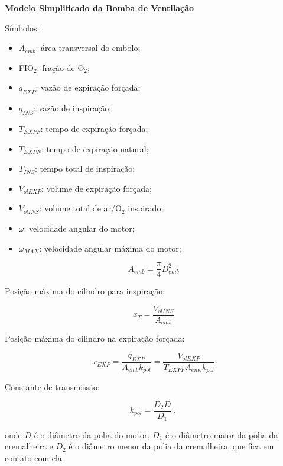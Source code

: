 \documentclass[a4paper,twosides,10pt]{article}
\begin{document}
\textbf{Modelo Simplificado da Bomba de Ventilação}

\vspace{1em}

Símbolos:

\begin{itemize}
\item $A_{emb}$: área transversal do embolo;
\item FIO$_2$: fração de O$_2$;
\item $q_{EXP}$: vazão de expiração forçada;
\item $q_{INS}$: vazão de inspiração;
\item $T_{EXPF}$: tempo de expiração forçada;
\item $T_{EXPN}$: tempo de expiração natural;
\item $T_{INS}$: tempo total de inspiração;
\item $V_{olEXP}$: volume de expiração forçada;
\item $V_{olINS}$: volume total de ar/O$_2$ inspirado;
\item $\omega$: velocidade angular do motor;
\item $\omega_{MAX}$: velocidade angular máxima do motor;
\end{itemize}

\begin{equation}
  \label{eq:aemb}
  A_{emb} = \dfrac{\pi}{4}D_{emb}^2
\end{equation}

Posição máxima do cilindro para inspiração:

\begin{equation}
  \label{eq:xt}
  x_T = \dfrac{V_{olINS}}{A_{emb}}
\end{equation}

Posição máxima do cilindro na expiração forçada:

\begin{equation}
  \label{eq:xexp}
  x_{EXP} = \dfrac{q_{EXP}}{A_{emb}k_{pol}} = \dfrac{V_{olEXP}}{T_{EXPF}A_{emb}k_{pol}}
\end{equation}

Constante de transmissão:

\begin{equation}
  \label{eq:kpol}
  k_{pol} = \dfrac{D_2 D}{D_1} \; ,
\end{equation}

\noindent onde $D$ é o diâmetro da polia do motor, $D_1$ é o diâmetro maior da polia da cremalheira e $D_2$ é o diâmetro menor da polia da cremalheira, que fica em contato com ela.
\end{document}
